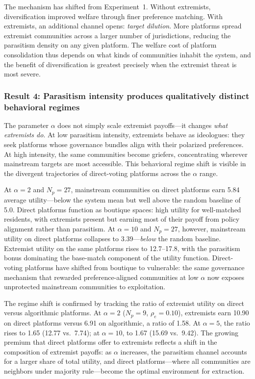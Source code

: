 The mechanism has shifted from Experiment~1. Without extremists, diversification improved welfare through finer preference matching. With extremists, an additional channel opens: \textit{target dilution}. More platforms spread extremist communities across a larger number of jurisdictions, reducing the parasitism density on any given platform. The welfare cost of platform consolidation thus depends on what kinds of communities inhabit the system, and the benefit of diversification is greatest precisely when the extremist threat is most severe.

\subsubsection{Result 4: Parasitism intensity produces qualitatively distinct behavioral regimes}

The parameter $\alpha$ does not simply scale extremist payoffs---it changes \textit{what extremists do}. At low parasitism intensity, extremists behave as ideologues: they seek platforms whose governance bundles align with their polarized preferences. At high intensity, the same communities become griefers, concentrating wherever mainstream targets are most accessible. This behavioral regime shift is visible in the divergent trajectories of direct-voting platforms across the $\alpha$ range.

At $\alpha = 2$ and $N_p = 27$, mainstream communities on direct platforms earn 5.84 average utility---below the system mean but well above the random baseline of 5.0. Direct platforms function as boutique spaces: high utility for well-matched residents, with extremists present but earning most of their payoff from policy alignment rather than parasitism. At $\alpha = 10$ and $N_p = 27$, however, mainstream utility on direct platforms collapses to 3.39---\textit{below} the random baseline. Extremist utility on the same platforms rises to 12.7--17.8, with the parasitism bonus dominating the base-match component of the utility function. Direct-voting platforms have shifted from boutique to vulnerable: the same governance mechanism that rewarded preference-aligned communities at low $\alpha$ now exposes unprotected mainstream communities to exploitation.

The regime shift is confirmed by tracking the ratio of extremist utility on direct versus algorithmic platforms. At $\alpha = 2$ ($N_p = 9$, $\rho_e = 0.10$), extremists earn 10.90 on direct platforms versus 6.91 on algorithmic, a ratio of 1.58. At $\alpha = 5$, the ratio rises to 1.65 (12.77 vs.\ 7.74); at $\alpha = 10$, to 1.67 (15.69 vs.\ 9.42). The growing premium that direct platforms offer to extremists reflects a shift in the composition of extremist payoffs: as $\alpha$ increases, the parasitism channel accounts for a larger share of total utility, and direct platforms---where all communities are neighbors under majority rule---become the optimal environment for extraction.

